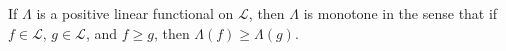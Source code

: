 If $\Lambda$ is a positive linear functional on $\mathcal{L}$, then $\Lambda$ is monotone in the sense that if $f \in \mathcal{L}$, $g \in \mathcal{L}$, and $f \geq g$, then $\Lambda(f) \geq \Lambda(g)$.
